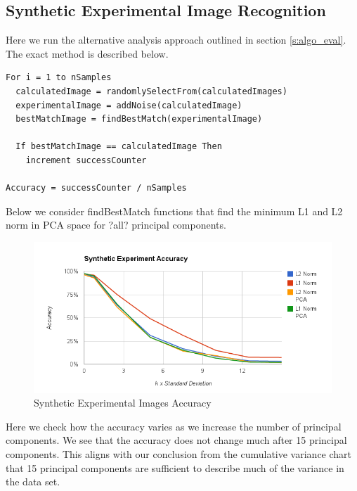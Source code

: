 \documentclass[12pt,letterpaper]{article}
\begin{document}
\clearpage

\subsection{Synthetic Experimental Image Recognition}
Here we run the alternative analysis approach outlined in section
\ref{s:algo_eval}. The exact method is described below.

\begin{verbatim}
For i = 1 to nSamples
  calculatedImage = randomlySelectFrom(calculatedImages)
  experimentalImage = addNoise(calculatedImage)
  bestMatchImage = findBestMatch(experimentalImage)

  If bestMatchImage == calculatedImage Then
    increment successCounter

Accuracy = successCounter / nSamples
\end{verbatim}

Below we consider findBestMatch functions that find the minimum L1 and L2 norm
in PCA space for ?all? principal components.

\begin{figure}[ht]
  \begin{center}
    \includegraphics[scale=0.8]{figs/accuracy_with_pca.png}
    \caption{Synthetic Experimental Images Accuracy}
  \end{center}
\end{figure}

Here we check how the accuracy varies as we increase the number of principal
components. We see that the accuracy does not change much after 15
principal components. This aligns with our conclusion from the cumulative
variance chart that 15 principal components are sufficient to describe much of
the variance in the data set.
\end{document}

